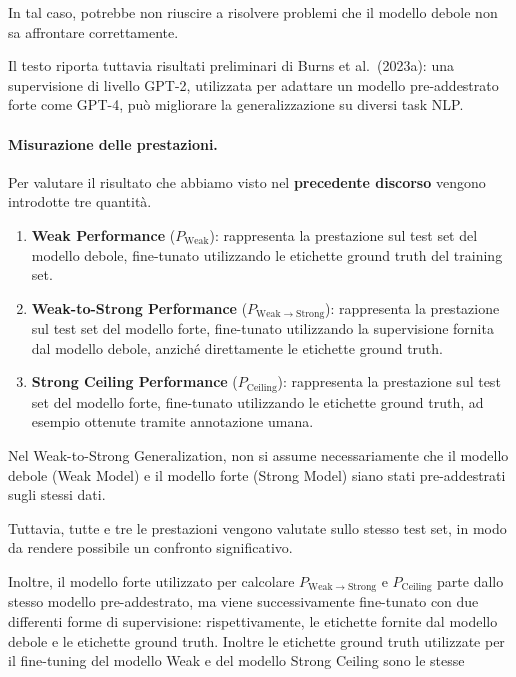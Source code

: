 In tal caso, potrebbe non riuscire
a risolvere problemi che il modello debole
non sa affrontare correttamente.

Il testo riporta tuttavia risultati preliminari
di Burns et al.\ (2023a):
una supervisione di livello GPT-2,
utilizzata per adattare un modello
pre-addestrato forte come GPT-4,
può migliorare la generalizzazione
su diversi task NLP.

\paragraph{Misurazione delle prestazioni.}
Per valutare il risultato che abbiamo visto nel \textbf{precedente discorso} vengono introdotte
tre quantità.


\begin{enumerate}
    \item \textbf{Weak Performance} ($P_{\mathrm{Weak}}$):
    rappresenta la prestazione sul test set del modello debole,
    fine-tunato utilizzando le etichette ground truth del
    training set.

    \item \textbf{Weak-to-Strong Performance}
    ($P_{\mathrm{Weak}\to\mathrm{Strong}}$):
    rappresenta la prestazione sul test set del modello forte,
    fine-tunato utilizzando la supervisione fornita dal
    modello debole, anziché direttamente le etichette
    ground truth.

    \item \textbf{Strong Ceiling Performance}
    ($P_{\mathrm{Ceiling}}$):
    rappresenta la prestazione sul test set del modello forte,
    fine-tunato utilizzando le etichette ground truth,
    ad esempio ottenute tramite annotazione umana.
\end{enumerate}

\begin{warning}{}
    Nel Weak-to-Strong Generalization, non si assume
    necessariamente che il modello debole (Weak Model)
    e il modello forte (Strong Model) siano stati
    pre-addestrati sugli stessi dati.

    Tuttavia, tutte e tre le prestazioni vengono valutate
    sullo stesso test set, in modo da rendere possibile
    un confronto significativo.

    Inoltre, il modello forte utilizzato per calcolare
    $P_{\mathrm{Weak}\to\mathrm{Strong}}$ e
    $P_{\mathrm{Ceiling}}$ parte dallo stesso modello
    pre-addestrato, ma viene successivamente
    fine-tunato con due differenti forme di supervisione:
    rispettivamente, le etichette fornite dal modello
    debole e le etichette ground truth.
    Inoltre le etichette ground truth utilizzate per il fine-tuning del modello Weak e del modello Strong Ceiling sono le stesse
\end{warning}


